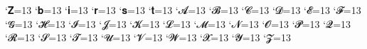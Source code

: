 \catcode`𝐙=13 
\catcode`𝐛=13 
\catcode`𝐢=13 
\catcode`𝐫=13 
\catcode`𝐬=13 
\catcode`𝐭=13 
\catcode`𝓐=13 
\catcode`𝓑=13 
\catcode`𝓒=13 
\catcode`𝓓=13 
\catcode`𝓔=13 
\catcode`𝓕=13 
\catcode`𝓖=13 
\catcode`𝓗=13 
\catcode`𝓘=13 
\catcode`𝓙=13 
\catcode`𝓚=13 
\catcode`𝓛=13 
\catcode`𝓜=13 
\catcode`𝓝=13 
\catcode`𝓞=13 
\catcode`𝓟=13 
\catcode`𝓠=13 
\catcode`𝓡=13 
\catcode`𝓢=13 
\catcode`𝓣=13 
\catcode`𝓤=13 
\catcode`𝓥=13 
\catcode`𝓦=13 
\catcode`𝓧=13 
\catcode`𝓨=13 
\catcode`𝓩=13 


